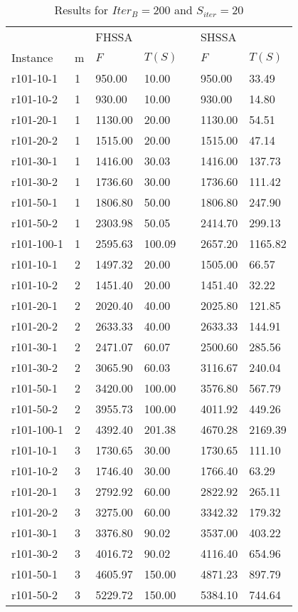 \documentclass[final,5p,times,twocolumn]{elsarticle}
\begin{document}
{{{{{{{{{\renewcommand{\arraystretch}{1.2}
\begin{table}[htbp]
\centering
\caption{Results for $Iter_{B}=200$ and $S_{iter}=20$}
\centering
\begin{tabular}{l l l l l l l}
\hline 
&&\multicolumn{2}{l}{FHSSA}&& \multicolumn{2}{l}{SHSSA}\\
\cline{3-4}\cline{6-7}
Instance & m & $F$ & $T(S)$ && $F$ & $T(S)$\\
\hline
r101-10-1&1&950.00&10.00&&950.00&33.49\\
r101-10-2&1&930.00&10.00&&930.00&14.80\\
r101-20-1&1&1130.00&20.00&&1130.00&54.51\\
r101-20-2&1&1515.00&20.00&&1515.00&47.14\\
r101-30-1&1&1416.00&30.03&&1416.00&137.73\\
r101-30-2&1&1736.60&30.00&&1736.60&111.42\\
r101-50-1&1&1806.80&50.00&&1806.80&247.90\\
r101-50-2&1&2303.98&50.05&&2414.70&299.13\\
r101-100-1&1&2595.63&100.09&&2657.20&1165.82\\
r101-10-1&2&1497.32&20.00&&1505.00&66.57\\
r101-10-2&2&1451.40&20.00&&1451.40&32.22\\
r101-20-1&2&2020.40&40.00&&2025.80&121.85\\
r101-20-2&2&2633.33&40.00&&2633.33&144.91\\
r101-30-1&2&2471.07&60.07&&2500.60&285.56\\
r101-30-2&2&3065.90&60.03&&3116.67&240.04\\
r101-50-1&2&3420.00&100.00&&3576.80&567.79\\
r101-50-2&2&3955.73&100.00&&4011.92&449.26\\
r101-100-1&2&4392.40&201.38&&4670.28&2169.39\\
r101-10-1&3&1730.65&30.00&&1730.65&111.10\\
r101-10-2&3&1746.40&30.00&&1766.40&63.29\\
r101-20-1&3&2792.92&60.00&&2822.92&265.11\\
r101-20-2&3&3275.00&60.00&&3342.32&179.32\\
r101-30-1&3&3376.80&90.02&&3537.00&403.22\\
r101-30-2&3&4016.72&90.02&&4116.40&654.96\\
r101-50-1&3&4605.97&150.00&&4871.23&897.79\\
r101-50-2&3&5229.72&150.00&&5384.10&744.64\\

\end{tabular}
\end{table}}}}}}}}}}
\end{document}
